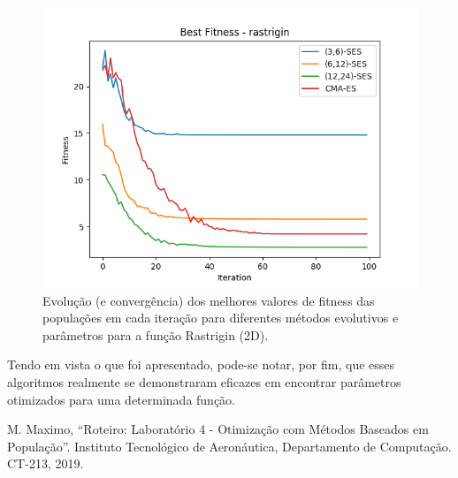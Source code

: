 \documentclass[conference]{IEEEtran}
\begin{document}
\begin{figure}[htbp]
\centering
\centerline{\includegraphics[scale=0.6]{imagens/rastrigin/best_fitness.png}}
\caption{Evolução (e convergência) dos melhores valores de fitness das populações em cada iteração para diferentes métodos evolutivos e parâmetros para a função Rastrigin (2D).}
\label{rastrigin/best_fitness}
\end{figure}

Tendo em vista o que foi apresentado, pode-se notar, por fim, que esses algoritmos realmente se demonstraram eficazes em encontrar parâmetros otimizados para uma determinada função.

\begin{thebibliography}{00}
 M. Maximo, ``Roteiro: Laboratório 4 - Otimização com Métodos Baseados em População''. Instituto Tecnológico de Aeronáutica, Departamento de Computação. CT-213, 2019.
\end{thebibliography}
\end{document}
